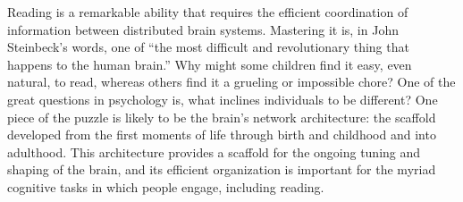 Reading is a remarkable ability that requires the efficient coordination of information between distributed brain systems. Mastering it is, in John Steinbeck's words, one of ``the most difficult and revolutionary thing that happens to the human brain.'' Why might some children find it easy, even natural, to read, whereas others find it a grueling or impossible chore? One of the great questions in psychology is, what inclines individuals to be different? One piece of the puzzle is likely to be the brain's network architecture: the scaffold developed from the first moments of life through birth and childhood and into adulthood. This architecture provides a scaffold for the ongoing tuning and shaping of the brain, and its efficient organization is important for the myriad cognitive tasks in which people engage, including reading.